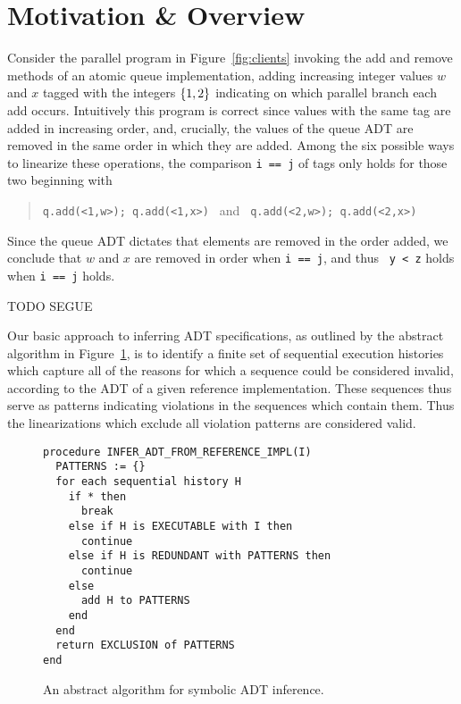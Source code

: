 \section{Motivation \& Overview}
\label{sec:motivation}

Consider the parallel program in Figure~\ref{fig:clients} invoking the add and
remove methods of an atomic queue implementation, adding increasing integer
values $w$ and $x$ tagged with the integers ${\{{1,2}\}}$ indicating on which
parallel branch each add occurs. Intuitively this program is correct since
values with the same tag are added in increasing order, and, crucially, the
values of the queue ADT are removed in the same order in which they are added.
Among the six possible ways to linearize these operations, the comparison {\tt i ==
j} of tags only holds for those two beginning with
\begin{quote}
  \verb|q.add(<1,w>); q.add(<1,x>) | and \verb| q.add(<2,w>); q.add(<2,x>)|
\end{quote}
Since the queue ADT dictates that elements are removed in the order added, we
conclude that $w$ and $x$ are removed in order when {\tt i == j}, and thus {\tt
y < z} holds when {\tt i == j} holds.

TODO SEGUE

Our basic approach to inferring ADT specifications, as outlined by the abstract
algorithm in Figure~\ref{fig:abstract}, is to identify a finite set of
sequential execution histories which capture all of the reasons for which a
sequence could be considered invalid, according to the ADT of a given reference
implementation. These sequences thus serve as patterns indicating violations in
the sequences which contain them. Thus the linearizations which exclude all
violation patterns are considered valid.

\begin{figure}[t]
  \begin{verbatim}
procedure INFER_ADT_FROM_REFERENCE_IMPL(I)
  PATTERNS := {}
  for each sequential history H
    if * then
      break
    else if H is EXECUTABLE with I then
      continue
    else if H is REDUNDANT with PATTERNS then
      continue
    else
      add H to PATTERNS
    end
  end
  return EXCLUSION of PATTERNS
end
  \end{verbatim}
  \caption{An abstract algorithm for symbolic ADT inference.}
  \label{fig:abstract}
\end{figure}

